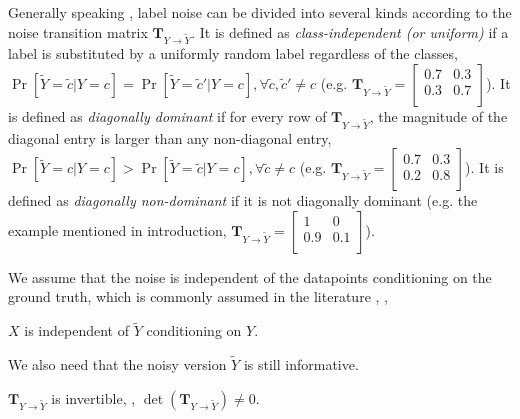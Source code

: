 Generally speaking \cite{patrini2017making, ghosh2017robust,  zhang2018generalized}, label noise can be divided into several kinds according to the noise transition matrix $\mathbf{T}_{Y\rightarrow \tilde{Y}}$. It is defined as \emph{class-independent (or uniform)} if a label is substituted by a uniformly random label regardless of the classes, \ie $\Pr[\tilde{Y}=\tilde{c} | Y=c] = \Pr[\tilde{Y}=\tilde{c}' | Y=c], \forall \tilde{c},\tilde{c}' \neq c$ (e.g. $\mathbf{T}_{Y \to \tilde{Y}} = \begin{bmatrix}
    0.7  & 0.3 \\
    0.3 & 0.7 \\
    \end{bmatrix}
    $). It is defined as \emph{diagonally dominant} if for every row of  $\mathbf{T}_{Y\rightarrow \tilde{Y}}$, the magnitude of the diagonal entry is larger than any non-diagonal entry, \ie $\Pr[\tilde{Y}=c | Y=c] > \Pr[\tilde{Y}=\tilde{c} | Y=c], \forall \tilde{c}\neq c$ (e.g. $\mathbf{T}_{Y \to \tilde{Y}} = \begin{bmatrix}
    0.7  & 0.3 \\
    0.2 & 0.8 \\
    \end{bmatrix}
    $).
It is defined as \emph{diagonally non-dominant} if it is not diagonally dominant (e.g. the example mentioned in introduction, $\mathbf{T}_{Y \to \tilde{Y}} = \begin{bmatrix}
    1  & 0 \\
    0.9 & 0.1 \\
    \end{bmatrix}
    $). 

We assume that the noise is independent of the datapoints conditioning on the ground truth, which is commonly assumed in the literature \cite{patrini2017making, ghosh2017robust, zhang2018generalized}, \ie, 

\begin{assumption}
	$X$ is independent of $\tilde{Y}$ conditioning on $Y$. 
\end{assumption}









We also need that the noisy version $\tilde{Y}$ is still informative. 
 
 \begin{assumption}
	$\mathbf{T}_{Y\rightarrow \tilde{Y}}$ is invertible, \ie, $\det(\mathbf{T}_{Y\rightarrow \tilde{Y}})\neq 0$.
\end{assumption}







